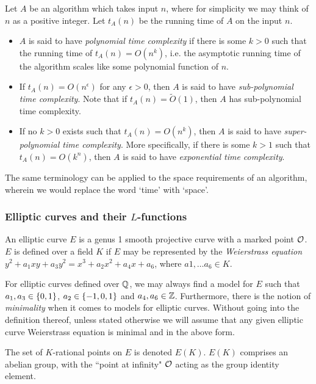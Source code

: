 \documentclass[10pt]{article}
\begin{document}
\begin{definition}
Let $A$ be an algorithm which takes input $n$, where for simplicity we may think of $n$ as a positive integer. Let $t_A(n)$ be the running time of $A$ on the input $n$.
\begin{itemize}
\item $A$ is said to have {\it polynomial time complexity} if there is some $k>0$ such that the running time of $t_A(n) = O(n^{k})$, i.e. the asymptotic running time of the algorithm scales like some polynomial function of $n$.
\item If $t_A(n) = O(n^{\epsilon})$ for any $\epsilon>0$, then $A$ is said to have {\it sub-polynomial time complexity}. Note that if $t_A(n) = \tilde{O}(1)$, then $A$ has sub-polynomial time complexity.
\item If no $k>0$ exists such that $t_A(n) = O(n^k)$, then $A$ is said to have {\it super-polynomial time complexity}. More specifically, if there is some $k>1$ such that $t_A(n) = O(k^n)$, then $A$ is said to have {\it exponential time complexity}.
\end{itemize}
\end{definition}
The same terminology can be applied to the space requirements of an algorithm, wherein we would replace the word `time' with `space'.


\subsubsection{Elliptic curves and their $L$-functions}

\begin{definition}
An elliptic curve $E$ is a genus 1 smooth projective curve with a marked point $\mathcal{O}$. $E$ is defined over a field $K$ if $E$ may be represented by the {\it Weierstrass equation} $y^2 + a_1 xy + a_3 y^2 = x^3 + a_2 x^2 + a_4 x + a_6$, where $a1,\ldots a_6 \in K$.
\end{definition}

For elliptic curves defined over $\mathbb{Q}$, we may always find a model for $E$ such that $a_1, a_3 \in \left\{0,1\right\}$, $a_2 \in \left\{-1,0,1\right\}$ and $a_4,a_6 \in \mathbb{Z}$. Furthermore, there is the notion of {\it minimality} when it comes to models for elliptic curves. Without going into the definition thereof, unless stated otherwise we will assume that any given elliptic curve Weierstrass equation is minimal and in the above form.

\begin{definition}
The set of $K$-rational points on $E$ is denoted $E(K)$. $E(K)$ comprises an abelian group, with the ``point at infinity" $\mathcal{O}$ acting as the group identity element.
\end{definition}
\end{document}
